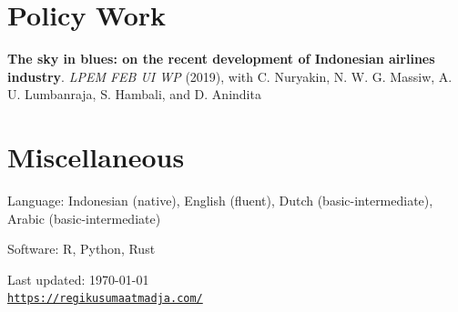 \documentclass[10pt,letterpaper]{article}
\def\footerlink{https://regikusumaatmadja.com/}
\begin{document}
\section*{Policy Work}
\textbf{The sky in blues: on the recent development of Indonesian airlines industry}. \textit{LPEM FEB UI WP} (2019), with C. Nuryakin, N. W. G. Massiw, A. U. Lumbanraja, S. Hambali, and D. Anindita 
\section*{Miscellaneous}
Language: Indonesian (native), English (fluent), Dutch (basic-intermediate), Arabic (basic-intermediate)

\smallskip
Software: R, Python, Rust
\begin{center}
  \begin{footnotesize}
    Last updated: \today \\
    \href{\footerlink}{\texttt{\footerlink}}
  \end{footnotesize}
\end{center}
\end{document}
